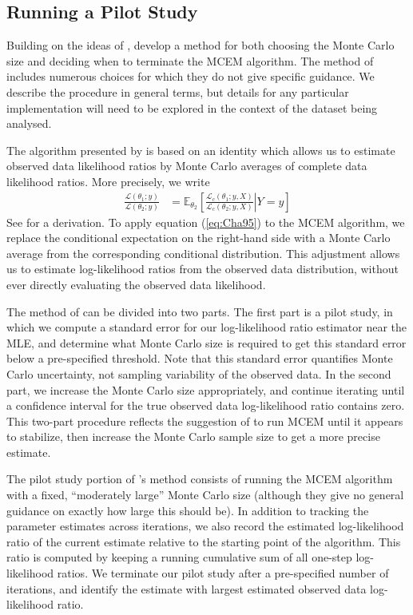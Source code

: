 \documentclass[11pt, oneside]{article}   	%
\newcommand{\bE}{\mathbb{E}}
\begin{document}
\subsection{Running a Pilot Study \citep{Cha95}}

Building on the ideas of \citeauthor{Wei90}, \citet{Cha95} develop a method for both choosing the Monte Carlo size and deciding when to terminate the MCEM algorithm. The method of \citeauthor{Cha95} includes numerous choices for which they do not give specific guidance. We describe the procedure in general terms, but details for any particular implementation will need to be explored in the context of the dataset being analysed. 

The algorithm presented by \citeauthor{Cha95} is based on an identity which allows us to estimate observed data likelihood ratios by Monte Carlo averages of complete data likelihood ratios. More precisely, we write
%
\begin{align}
	\frac{\mathcal{L}(\theta_1; y)}{\mathcal{L}(\theta_2; y)} &= \bE_{\theta_2} \left[ \left. \frac{\mathcal{L}_c(\theta_1; y, X)}{\mathcal{L}_c(\theta_2; y, X)} \right| Y=y \right] \label{eq:Cha95}
\end{align}
%
See \citet{Cha95} for a derivation. To apply equation (\ref{eq:Cha95}) to the MCEM algorithm, we replace the conditional expectation on the right-hand side with a Monte Carlo average from the corresponding conditional distribution. This adjustment allows us to estimate log-likelihood ratios from the observed data distribution, without ever directly evaluating the observed data likelihood. 



The method of \citeauthor{Cha95} can be divided into two parts. The first part is a pilot study, in which we compute a standard error for our log-likelihood ratio estimator near the MLE, and determine what Monte Carlo size is required to get this standard error below a pre-specified threshold. Note that this standard error quantifies Monte Carlo uncertainty, not sampling variability of the observed data. In the second part, we increase the Monte Carlo size appropriately, and continue iterating until a confidence interval for the true observed data log-likelihood ratio contains zero. This two-part procedure reflects the suggestion of \citet{Wei90} to run MCEM until it appears to stabilize, then increase the Monte Carlo sample size to get a more precise estimate.


The pilot study portion of \citeauthor{Cha95}'s method consists of running the MCEM algorithm with a fixed, ``moderately large'' Monte Carlo size (although they give no general guidance on exactly how large this should be).  In addition to tracking the parameter estimates across iterations, we also record the estimated log-likelihood ratio of the current estimate relative to the starting point of the algorithm. This ratio is computed by keeping a running cumulative sum of all one-step log-likelihood ratios. We terminate our pilot study after a pre-specified number of iterations, and identify the estimate with largest estimated observed data log-likelihood ratio. 
\end{document}
